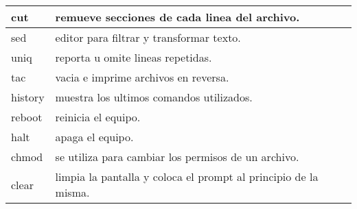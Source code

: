 \documentclass[10pt]{article}
\begin{document}
\begin{tabular}{||l|l|l||}
cut & remueve secciones de cada linea del archivo. & \\ \hline
sed & editor para filtrar y transformar texto. & \\ \hline
uniq & reporta u omite lineas repetidas. & \\ \hline
tac & vacia e imprime archivos en reversa. & \\ \hline
history & muestra los ultimos comandos utilizados. & \\ \hline
reboot & reinicia el equipo. & \\ \hline
halt & apaga el equipo. & \\ \hline
chmod & se utiliza para cambiar los permisos de un archivo. & \\ \hline
clear & limpia la pantalla y coloca el prompt al principio de la misma. & \\ \hline \hline
\end{tabular}

\end{document}
